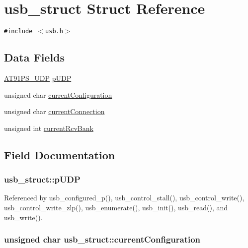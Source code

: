 \hypertarget{structusb__struct}{
\section{usb\_\-struct Struct Reference}
\label{structusb__struct}
}
{\tt \#include $<$usb.h$>$}

\subsection*{Data Fields}
\begin{CompactItemize}
\item 
\hyperlink{struct__AT91S__UDP}{AT91PS\_\-UDP} \hyperlink{structusb__struct_031f0d04edf8e02989533b0cfe38e6a9}{pUDP}
\item 
unsigned char \hyperlink{structusb__struct_319710a279323c97008232b1ddd8508d}{currentConfiguration}
\item 
unsigned char \hyperlink{structusb__struct_dae69c084e8a095ac39d815bcb30f3ed}{currentConnection}
\item 
unsigned int \hyperlink{structusb__struct_281ada4c65e5363e29d3a96947dce4da}{currentRcvBank}
\end{CompactItemize}


\subsection{Field Documentation}
\hypertarget{structusb__struct_031f0d04edf8e02989533b0cfe38e6a9}{
\subsubsection{ {\bf usb\_\-struct::pUDP}}}
\label{structusb__struct_031f0d04edf8e02989533b0cfe38e6a9}




Referenced by usb\_\-configured\_\-p(), usb\_\-control\_\-stall(), usb\_\-control\_\-write(), usb\_\-control\_\-write\_\-zlp(), usb\_\-enumerate(), usb\_\-init(), usb\_\-read(), and usb\_\-write().\hypertarget{structusb__struct_319710a279323c97008232b1ddd8508d}{
\subsubsection{\setlength{\rightskip}{0pt plus 5cm}unsigned char {\bf usb\_\-struct::currentConfiguration}}}
\label{structusb__struct_319710a279323c97008232b1ddd8508d}




